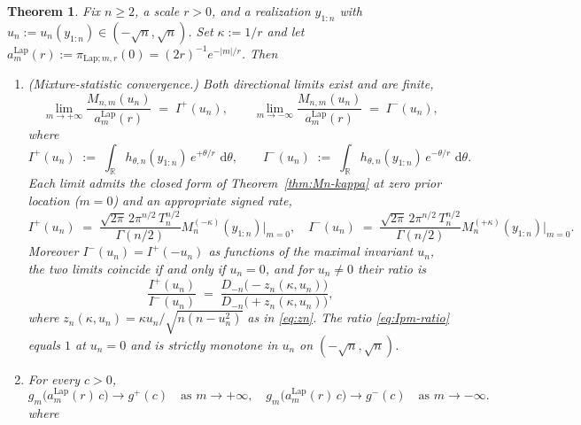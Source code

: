 \documentclass{article}%
\newtheorem{theorem}{Theorem}[section]
\newcommand{\dd}{\,\mathrm{d}}
\newcommand{\Lap}{\mathrm{Lap}}
\newcommand{\1}{\mathbf{1}}
\begin{document}
\begin{theorem}\label{thm:laplace-limits}
Fix $n\geq 2$, a scale $r>0$, and a realization $y_{1:n}$ with
$u_n := u_n(y_{1:n})\in(-\sqrt n,\sqrt n)$. Set $\kappa := 1/r$ and let
$a_m^{\Lap}(r) := \pi_{\Lap;m,r}(0) = (2r)^{-1}e^{-|m|/r}$.
Then 
\begin{enumerate}
    \item[(a)] (Mixture-statistic convergence.) Both directional limits exist and are finite,
\begin{equation}\label{eq:Lap-limits}
  \lim_{m\to+\infty}\frac{M_{n,m}(u_n)}{a_m^{\Lap}(r)}
  \;=\;I^+(u_n),
  \qquad
  \lim_{m\to-\infty}\frac{M_{n,m}(u_n)}{a_m^{\Lap}(r)}
  \;=\;I^-(u_n),
\end{equation}
where
\begin{equation}\label{eq:Ipm-def}
  I^+(u_n) \;:=\;\int_\mathbb{R} h_{\theta,n}(y_{1:n})\,e^{+\theta/r}\,\dd\theta,
  \qquad
  I^-(u_n) \;:=\;\int_\mathbb{R} h_{\theta,n}(y_{1:n})\,e^{-\theta/r}\,\dd\theta.
\end{equation}
Each limit admits the closed form of Theorem~\ref{thm:Mn-kappa} at
zero prior location ($m=0$) and an appropriate signed rate,
\begin{equation}\label{eq:Ipm-closed}
  I^+(u_n) \;=\; \frac{\sqrt{2\pi} \, 2\pi^{n/2} \, T_n^{n/2} }{\Gamma(n/2)} M_n^{(-\kappa)}(y_{1:n})\big|_{m=0},
  \quad
  I^-(u_n) \;=\; \frac{\sqrt{2\pi} \, 2\pi^{n/2} \, T_n^{n/2} }{\Gamma(n/2)} M_n^{(+\kappa)}(y_{1:n})\big|_{m=0}.
\end{equation}
Moreover $I^-(u_n) = I^+(-u_n)$ as functions of the maximal invariant
$u_n$, the two limits coincide if and only if $u_n=0$, and for
$u_n\neq 0$ their ratio is
\begin{equation}\label{eq:Ipm-ratio}
  \frac{I^+(u_n)}{I^-(u_n)}
  \;=\;\frac{D_{-n}\!\bigl(-z_n(\kappa,u_n)\bigr)}
            {D_{-n}\!\bigl(+z_n(\kappa,u_n)\bigr)},
\end{equation}
where $z_n(\kappa,u_n) = \kappa u_n/\sqrt{n(n-u_n^2)}$ as in
\eqref{eq:zn}. The ratio \eqref{eq:Ipm-ratio} equals $1$ at $u_n=0$ and
is strictly monotone in $u_n$ on $(-\sqrt n,\sqrt n)$.
    \item[(b)] For every $c>0$,
\begin{equation}\label{eq:gm-conv}
  g_m\!\bigl(a_m^{\Lap}(r)\,c\bigr) \longrightarrow g^+(c)
  \quad\text{as }m\to+\infty,
  \quad
  g_m\!\bigl(a_m^{\Lap}(r)\,c\bigr) \longrightarrow g^-(c)
  \quad\text{as }m\to-\infty.
\end{equation}
where 
\begin{equation}\label{eq:gm-Lap}

\end{equation}
\end{enumerate}
\end{theorem}
\end{document}
